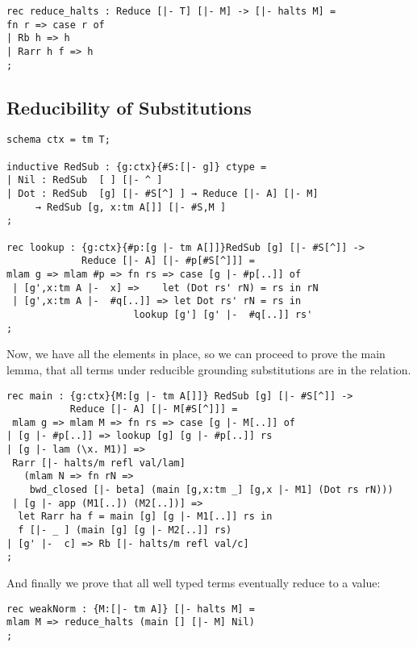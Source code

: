 \begin{lstlisting}
rec reduce_halts : Reduce [|- T] [|- M] -> [|- halts M] =
fn r => case r of
| Rb h => h
| Rarr h f => h
;
\end{lstlisting}

\subsection{Reducibility of Substitutions}

\begin{lstlisting}
schema ctx = tm T;

inductive RedSub : {g:ctx}{#S:[|- g]} ctype =
| Nil : RedSub  [ ] [|- ^ ]
| Dot : RedSub  [g] [|- #S[^] ] → Reduce [|- A] [|- M]
     → RedSub [g, x:tm A[]] [|- #S,M ]
;

rec lookup : {g:ctx}{#p:[g |- tm A[]]}RedSub [g] [|- #S[^]] ->
             Reduce [|- A] [|- #p[#S[^]]] =
mlam g => mlam #p => fn rs => case [g |- #p[..]] of
 | [g',x:tm A |-  x] =>    let (Dot rs' rN) = rs in rN
 | [g',x:tm A |-  #q[..]] => let Dot rs' rN = rs in
                      lookup [g'] [g' |-  #q[..]] rs'
;
\end{lstlisting}

Now, we have all the elements in place, so we can proceed to prove the
main lemma, that all terms under reducible grounding substitutions are
in the  relation.
\begin{lstlisting}
rec main : {g:ctx}{M:[g |- tm A[]]} RedSub [g] [|- #S[^]] ->
           Reduce [|- A] [|- M[#S[^]]] =
 mlam g => mlam M => fn rs => case [g |- M[..]] of
| [g |- #p[..]] => lookup [g] [g |- #p[..]] rs
| [g |- lam (\x. M1)] =>
 Rarr [|- halts/m refl val/lam]
   (mlam N => fn rN =>
    bwd_closed [|- beta] (main [g,x:tm _] [g,x |- M1] (Dot rs rN)))
 | [g |- app (M1[..]) (M2[..])] =>
  let Rarr ha f = main [g] [g |- M1[..]] rs in
  f [|- _ ] (main [g] [g |- M2[..]] rs)
| [g' |-  c] => Rb [|- halts/m refl val/c]
;
\end{lstlisting}

And finally we prove that all well typed terms eventually reduce to a
value:
\begin{lstlisting}
rec weakNorm : {M:[|- tm A]} [|- halts M] =
mlam M => reduce_halts (main [] [|- M] Nil)
;
\end{lstlisting}
